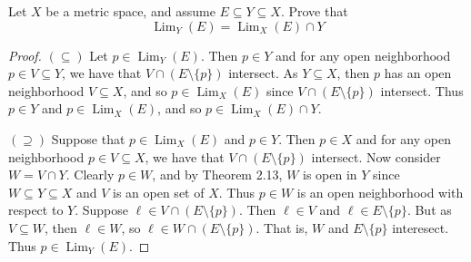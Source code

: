\documentclass[10pt,reqno]{amsart}
\theoremstyle{definition}
\DeclareMathOperator{\Lim}{Lim}
\begin{document}
\begin{tcolorbox}[colback=black!5!white,colframe=black!75!black,title= Chapter 4: Exercise 1.2.] Let $X$ be a metric space, and assume $E \subseteq Y \subseteq X$. Prove that 
\[
\Lim_Y (E) = \Lim_X(E) \cap Y
\]
\tcblower
\begin{proof} $(\subseteq)$ Let $p \in \Lim_Y(E)$. Then $p \in Y$ and for any open neighborhood $p \in V \subseteq Y$, we have that $V \cap (E\setminus \{ p \})$ intersect. As $Y \subseteq X$, then $p$ has an open neighborhood $V \subseteq X$, and so $p \in \Lim_X(E)$ since $V \cap (E \setminus \{ p \})$ intersect. Thus $p \in Y$ and $p \in \Lim_X(E)$, and so $p \in \Lim_X(E) \cap Y$.

$(\supseteq)$ Suppose that $p \in \Lim_X(E)$ and $p \in Y$. Then $p \in X$ and for any open neighborhood $p \in V\subseteq X$, we have that $V \cap (E \setminus \{p \}) $ intersect. Now consider $W = V \cap Y$. Clearly $p \in W$, and by Theorem 2.13, $W$ is open in $Y$ since $W \subseteq Y \subseteq X$ and $V$ is an open set of $X$. Thus $p \in W$ is an open neighborhood with respect to $Y$. Suppose $\ell \in V \cap (E\setminus \{ p \})$. Then $\ell \in V $ and $\ell \in E \setminus \{ p \}$. But as $V \subseteq W$, then $\ell \in W$, so $\ell \in W \cap (E\setminus \{ p \})$. That is, $W$ and $E\setminus \{ p \}$ interesect. Thus $p \in \Lim_Y(E)$.
\end{proof}
\end{tcolorbox}
\end{document}
